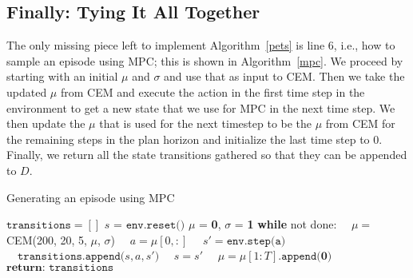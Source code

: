 \documentclass[12pt]{article}
\begin{document}
\subsection*{Finally: Tying It All Together}
The only missing piece left to implement Algorithm~\ref{pets} is line 6, i.e., how to sample an episode using MPC; this is shown in Algorithm~\ref{mpc}.  We proceed by starting with an initial $\mu$ and $\sigma$ and use that as input to CEM.  Then we take the updated $\mu$ from CEM and execute the action in the first time step in the environment to get a new state that we use for MPC in the next time step.  We then update the $\mu$ that is used for the next timestep to be the $\mu$ from CEM for the remaining steps in the plan horizon and initialize the last time step to 0.  Finally, we return all the state transitions gathered so that they can be appended to $D$.  

\begin{algorithm}
\caption{Generating an episode using MPC\label{mpc}}
\begin{algorithmic}[1]
\State $\texttt{transitions} = []$
\State $s$ = $\texttt{env.reset()}$
\State $\mu$ = \textbf{0}, $\sigma$ = \textbf{1}
\State \textbf{while} not done:
\State $\quad \mu=$CEM(200, 20, 5, $\mu$, $\sigma$)
\State $\quad a=\mu[0,:]$
\State $\quad s' = \texttt{env.step(a)}$
\State $\quad \texttt{transitions.append(}s, a, s'\texttt{)}$
\State $\quad s = s'$
\State $\quad \mu=\mu[1:T]\texttt{.append(}\textbf{0}\texttt{)}$
\State $\textbf{return: } \texttt{transitions}$
\EndProcedure
\end{algorithmic}
\end{algorithm}
\end{document}
